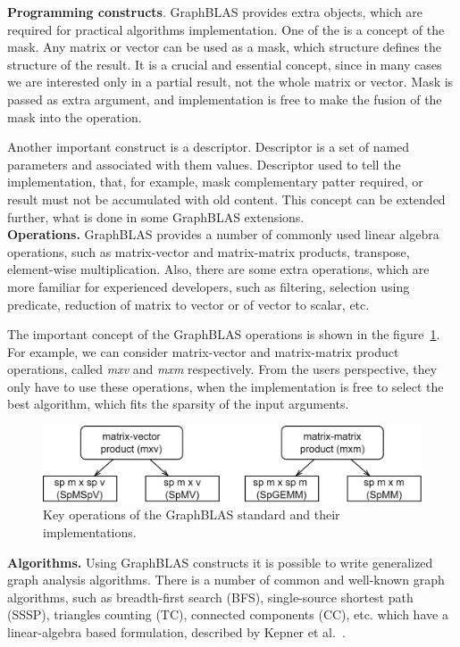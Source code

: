 \textbf{Programming constructs}. GraphBLAS provides extra objects, which are required for practical algorithms implementation. One of the is a concept of the mask. Any matrix or vector can be used as a mask, which structure defines the structure of the result. It is a crucial and essential concept, since in many cases we are interested only in a partial result, not the whole matrix or vector. Mask is passed as extra argument, and implementation is free to make the fusion of the mask into the operation.

Another important construct is a descriptor. Descriptor is a set of named parameters and associated with them values. Descriptor used to tell the implementation, that, for example, mask complementary patter required, or result must not be accumulated with old content. This concept can be extended further, what is done in some GraphBLAS extensions.\\

\textbf{Operations.} GraphBLAS provides a number of commonly used linear algebra operations, such as matrix-vector and matrix-matrix products, transpose, element-wise multiplication. Also, there are some extra operations, which are more familiar for experienced developers, such as filtering, selection using predicate, reduction of matrix to vector or of vector to scalar, etc.

The important concept of the GraphBLAS operations is shown in the figure~\ref{fig:gb_ops}. For example, we can consider matrix-vector and matrix-matrix product operations, called \textit{mxv} and \textit{mxm} respectively. From the users perspective, they only have to use these operations, when the implementation is free to select the best algorithm, which fits the sparsity of the input arguments.

\begin{figure}[h]
    \centering
    \includegraphics[width=1.0\textwidth]{images/types_of_operations.png}
    \caption{Key operations of the GraphBLAS standard and their implementations.}
    \label{fig:gb_ops}
\end{figure}

\textbf{Algorithms.} Using GraphBLAS constructs it is possible to write generalized graph analysis algorithms. There is a number of common and well-known graph algorithms, such as breadth-first search (BFS), single-source shortest path (SSSP), triangles counting (TC), connected components (CC), etc. which have a linear-algebra based formulation, described by Kepner et al.~\cite{misc:la_graph}.

